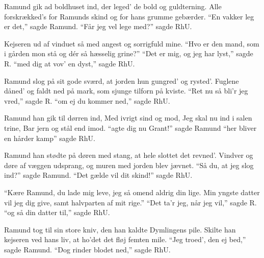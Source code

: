 \begin{paracol}{2}
\begin{guitar}
  Ramund gik ad boldhuset ind,
  der leged' de bold og guldterning.
  Alle forskrækked's for Ramunds skind
  og for hans grumme gebærder.
  ``En vakker leg er det,'' sagde Ramund.
  ``Får jeg vel lege med?'' sagde RhU.
\end{guitar}

\switchcolumn

\begin{guitar}
  Kejseren ud af vinduet så
  med angest og sorrigfuld mine.
  ``Hvo er den mand, som i gården mon stå
  og dér så hæsselig grine?''
  ``Det er mig, og jeg har lyst,'' sagde R.
  ``med dig at vov' en dyst,'' sagde RhU.

  Ramund slog på sit gode sværd,
  at jorden hun gungred' og rysted'.
  Fuglene dåned' og faldt ned på mark,
  som sjunge tilforn på kviste.
  ``Ret nu så bli'r jeg vred,'' sagde R.
  ``om ej du kommer ned,'' sagde RhU.

  Ramund han gik til dørren ind,
  Med ivrigt sind og mod,
  Jeg skal nu ind i salen trine,
  Bar jern og stål end imod.
  ``agte dig nu Grant!'' sagde Ramund
  ``her bliver en hårder kamp'' sagde RhU.

  Ramund han stødte på døren med stang,
  at hele slottet det revned'.
  Vindver og døre af væggen udsprang,
  og muren med jorden blev jævnet.
  ``Så du, at jeg slog ind?'' sagde Ramund.
  ``Det gælde vil dit skind!'' sagde RhU.

  ``Kære Ramund, du lade mig leve,
  jeg så omend aldrig din lige.
  Min yngste datter vil jeg dig give,
  samt halvparten af mit rige.''
  ``Det ta'r jeg, når jeg vil,'' sagde R.
  ``og så din datter til,'' sagde RhU.

  Ramund tog til sin store kniv,
  den han kaldte Dymlingens pile.
  Skilte han kejseren ved hans liv,
  at ho'det det fløj femten mile.
  ``Jeg troed', den ej bed,'' sagde Ramund.
  ``Dog rinder blodet ned,'' sagde RhU.
\end{guitar}
\end{paracol}
